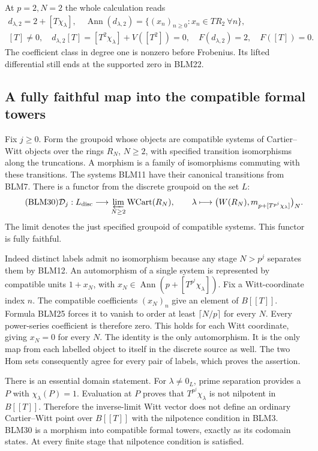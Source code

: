At $p=2,N=2$ the whole calculation reads
\begin{equation}\tag{BLM29}
\begin{gathered}
d_{\lambda,2}=2+[T\chi_\lambda],\quad
\operatorname{Ann}(d_{\lambda,2})
=\{(x_n)_{n\ge0}:x_n\in TR_2\ \forall n\},\\
[T]\ne0,\quad d_{\lambda,2}[T]
=[T^2\chi_\lambda]+V([T^2])=0,\quad
F(d_{\lambda,2})=2,\quad F([T])=0.
\end{gathered}
\end{equation}
The coefficient class in degree one is nonzero before Frobenius.
Its lifted differential still ends at the supported zero in BLM22.

\subsection{A fully faithful map into the compatible formal towers}
Fix $j\ge0$. Form the groupoid whose objects are compatible systems
of Cartier--Witt objects over the rings $R_N$, $N\ge2$, with
specified transition isomorphisms along the truncations. A morphism
is a family of isomorphisms commuting with these transitions.
The systems BLM11 have their canonical transitions from BLM7.
There is a functor from the discrete groupoid on the set $L$:
\begin{equation}\tag{BLM30}
\mathcal D_j:L_{\rm disc}\longrightarrow
\varprojlim_{N\ge2}\mathrm{WCart}(R_N),\qquad
\lambda\longmapsto
\bigl(W(R_N),m_{p+[T^{p^j}\chi_\lambda]}\bigr)_N.
\end{equation}
The limit denotes the just specified groupoid of compatible
systems. This functor is fully faithful.

Indeed distinct labels admit no isomorphism because any stage
$N>p^j$ separates them by BLM12. An automorphism of a single
system is represented by compatible units $1+x_N$, with
$x_N\in\operatorname{Ann}(p+[T^{p^j}\chi_\lambda])$.
Fix a Witt-coordinate index $n$. The compatible coefficients
$(x_N)_n$ give an element of $B[[T]]$. Formula BLM25 forces it
to vanish to order at least $\lceil N/p\rceil$ for every $N$.
Every power-series coefficient is therefore zero. This holds
for each Witt coordinate, giving $x_N=0$ for every $N$.
The identity is the only automorphism. It is the only map from
each labelled object to itself in the discrete source as well.
The two Hom sets consequently agree for every pair of labels,
which proves the assertion.

There is an essential domain statement. For $\lambda\ne0_L$,
prime separation provides a $P$ with $\chi_\lambda(P)=1$.
Evaluation at $P$ proves that $T^{p^j}\chi_\lambda$ is not
nilpotent in $B[[T]]$. Therefore the inverse-limit Witt vector
does not define an ordinary Cartier--Witt point over $B[[T]]$
with the nilpotence condition in BLM3. BLM30 is a morphism
into compatible formal towers, exactly as its codomain states.
At every finite stage that nilpotence condition is satisfied.

